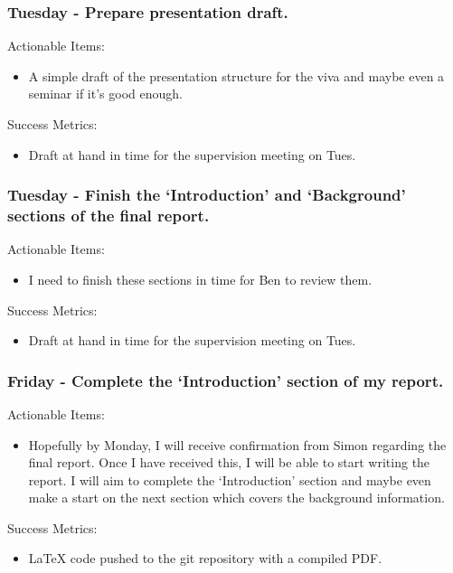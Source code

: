 \subsubsection{Tuesday - Prepare presentation draft.}

Actionable Items:

\begin{itemize}
    \item A simple draft of the presentation structure for the viva and maybe even a seminar if it's good enough.
\end{itemize}

Success Metrics:

\begin{itemize}
    \item Draft at hand in time for the supervision meeting on Tues.
\end{itemize}



\subsubsection{Tuesday - Finish the `Introduction' and `Background' sections of the final report.}

Actionable Items:

\begin{itemize}
    \item I need to finish these sections in time for Ben to review them.
\end{itemize}

Success Metrics:

\begin{itemize}
    \item Draft at hand in time for the supervision meeting on Tues.
\end{itemize}


\subsubsection{Friday - Complete the `Introduction' section of my report.}

Actionable Items:

\begin{itemize}
    \item Hopefully by Monday, I will receive confirmation from Simon regarding the final report. Once I have received this, I will be able to start writing the report. I will aim to complete the `Introduction' section and maybe even make a start on the next section which covers the background information.
\end{itemize}

Success Metrics:

\begin{itemize}
    \item LaTeX code pushed to the git repository with a compiled PDF.
\end{itemize}
